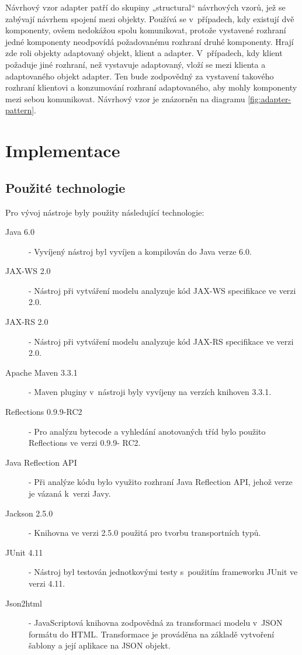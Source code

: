 \documentclass[11pt,twoside,a4paper]{book}
\begin{document}
Návrhový vzor adapter patří do skupiny „structural“ návrhových vzorů, jež se
zabývají návrhem spojení mezi objekty. Používá se v~případech, kdy existují dvě
komponenty, ovšem nedokážou spolu komunikovat, protože vystavené rozhraní jedné
komponenty neodpovídá požadovanému rozhraní druhé komponenty. Hrají zde roli
objekty adaptovaný objekt, klient a adapter. V~případech, kdy klient požaduje
jiné rozhraní, než vystavuje adaptovaný, vloží se mezi klienta a adaptovaného
objekt adapter. Ten bude zodpovědný za vystavení takového rozhraní klientovi a
konzumování rozhraní adaptovaného, aby mohly komponenty mezi sebou komunikovat.
Návrhový vzor je znázorněn na diagramu \ref{fig:adapter-pattern}.

\chapter{Implementace}

\section{Použité technologie}

Pro vývoj nástroje byly použity následující technologie:
\begin{description}
\item[Java 6.0 \cite{JavaHome}] - Vyvíjený nástroj byl vyvíjen a kompilován do Java
verze 6.0.
\item[JAX-WS 2.0 \cite{JAXWS20}]- Nástroj při vytváření modelu analyzuje kód JAX-WS
specifikace ve verzi 2.0.
\item[JAX-RS 2.0 \cite{JAXRS20}] - Nástroj při vytváření modelu analyzuje kód JAX-RS
specifikace ve verzi 2.0.
\item[Apache Maven 3.3.1 \cite{MavenHome}] - Maven pluginy v~nástroji byly vyvíjeny na
verzích knihoven 3.3.1.
\item[Reflections 0.9.9-RC2 \cite{ReflectionsHome}] - Pro analýzu bytecode a vyhledání
anotovaných tříd bylo použito Reflections ve verzi 0.9.9- RC2.
\item[Java Reflection API] - Při analýze kódu bylo využito rozhraní
Java Reflection API, jehož verze je vázaná k~verzi Javy.
\item[Jackson 2.5.0 \cite{JacksonHome}] - Knihovna ve verzi 2.5.0 použitá pro tvorbu
transportních typů.
\item[JUnit 4.11 \cite{JUnitHome}] - Nástroj byl testován jednotkovými testy
s~použitím frameworku JUnit ve verzi 4.11.
\item[Json2html \cite{JSON2HTMLHome}] - JavaScriptová knihovna zodpovědná za transformaci
modelu v~JSON formátu do HTML. Transformace je prováděna na základě vytvoření šablony a její aplikace na JSON objekt.
\end{description}
\end{document}
